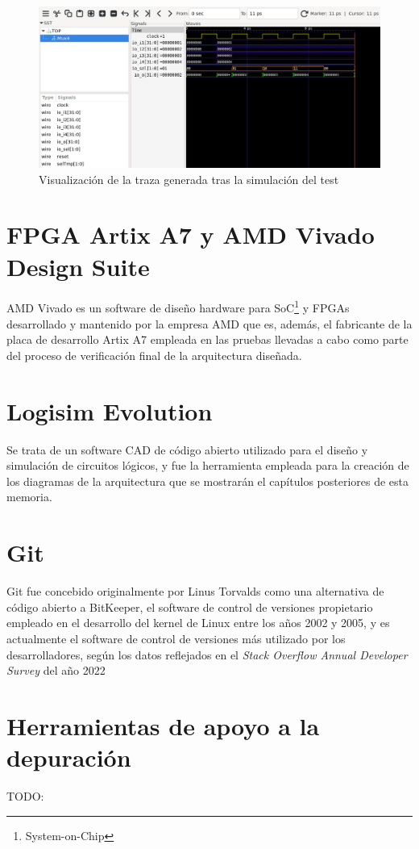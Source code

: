 \vspace{+0.5cm}
\begin{figure}[h]
  \centering
  \includegraphics[width=0.8\linewidth]{res/img/test_mux4_gtkwave.png}
  \caption{Visualización de la traza generada tras la simulación del test}
\end{figure}

\section{FPGA Artix A7 y AMD Vivado Design Suite}

AMD Vivado es un software de diseño hardware para SoC\footnote{System-on-Chip} y FPGAs desarrollado y mantenido por la empresa AMD que es, además, el fabricante de la placa de desarrollo Artix A7 empleada en las pruebas llevadas a cabo como parte del proceso de verificación final de la arquitectura diseñada.

\section{Logisim Evolution}

Se trata de un software CAD de código abierto utilizado para el diseño y simulación de circuitos lógicos, y fue la herramienta empleada para la creación de los diagramas de la arquitectura que se mostrarán el capítulos posteriores de esta memoria.

\section{Git}

Git fue concebido originalmente por Linus Torvalds como una alternativa de código abierto a BitKeeper, el software de control de versiones propietario empleado en el desarrollo del kernel de Linux entre los años 2002 y 2005\cite{githistory}, y es actualmente el software de control de versiones más utilizado por los desarrolladores, según los datos reflejados en el \textit{Stack Overflow Annual Developer Survey} del año 2022\cite{stackoverflow}

\section{Herramientas de apoyo a la depuración}

TODO: